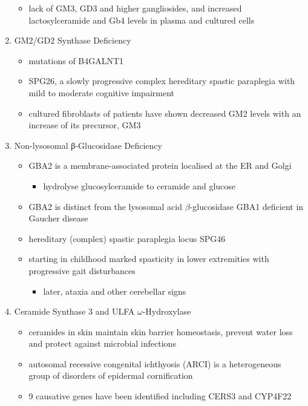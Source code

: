 \documentclass{scrartcl}
\begin{document}
\begin{enumerate}
\begin{itemize}
\item lack of GM3, GD3 and higher gangliosides, and increased
lactosylceramide and Gb4 levels in plasma and cultured cells
\end{itemize}

\item GM2/GD2 Synthase Deficiency
\label{sec:orgaf113e0}

\begin{itemize}
\item mutations of B4GALNT1
\item SPG26, a slowly progressive complex hereditary spastic paraplegia
with mild to moderate cognitive impairment

\item cultured fibroblasts of patients have shown decreased GM2 levels
with an increase of its precursor, GM3
\end{itemize}

\item Non-lysosomal β-Glucosidase Deficiency
\label{sec:org1b5d53e}

\begin{itemize}
\item GBA2 is a membrane-associated protein localised at the ER and Golgi
\begin{itemize}
\item hydrolyse glucosylceramide to ceramide and glucose
\end{itemize}
\item GBA2 is distinct from the lysosomal acid \(\beta\)-glucosidase GBA1 deficient in Gaucher disease
\item hereditary (complex) spastic paraplegia locus SPG46
\item starting in childhood marked spasticity in lower extremities with
progressive gait disturbances
\begin{itemize}
\item later, ataxia and other cerebellar signs
\end{itemize}
\end{itemize}

\item Ceramide Synthase 3 and ULFA \(\omega\)-Hydroxylase
\label{sec:org26b83d9}

\begin{itemize}
\item ceramides in skin maintain skin barrier homeostasis, prevent water
loss and protect against microbial infections
\item autosomal recessive congenital ichthyosis (ARCI) is a heterogeneous
group of disorders of epidermal cornification
\item 9 causative genes have been identified including CERS3 and CYP4F22


\end{itemize}
\end{enumerate}
\end{document}
